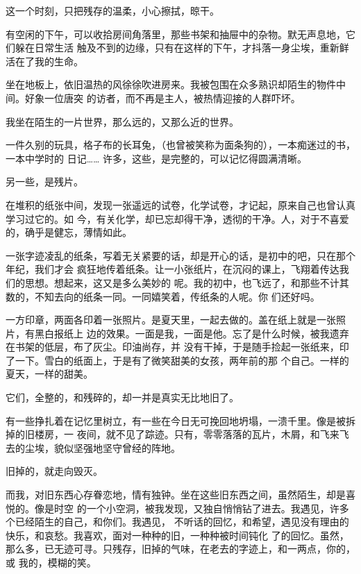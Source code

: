 		这一个时刻，只把残存的温柔，小心擦拭，晾干。

	\endwriting



		有空闲的下午，可以收拾房间角落里，那些书架和抽屉中的杂物。默无声息地，它们躲在日常生活
	触及不到的边缘，只有在这样的下午，才抖落一身尘埃，重新鲜活在了我的生命。

		坐在地板上，依旧温热的风徐徐吹进房来。我被包围在众多熟识却陌生的物件中间。好象一位唐突
	的访者，而不再是主人，被热情迎接的人群吓坏。

		我坐在陌生的一片世界，那么远的，又那么近的世界。

		一件久别的玩具，格子布的长耳兔，（也曾被笑称为面条狗的），一本痴迷过的书，一本中学时的
	日记…… 许多，这些，是完整的，可以记忆得圆满清晰。

		另一些，是残片。

		在堆积的纸张中间，发现一张遥远的试卷，化学试卷，才记起，原来自己也曾认真学习过它的。如
	今，有关化学，却已忘却得干净，透彻的干净。人，对于不喜爱的，确乎是健忘，薄情如此。

		一张字迹凌乱的纸条，写着无关紧要的话，却是开心的话，是初中的吧，只在那个年纪，我们才会
	疯狂地传着纸条。让一小张纸片，在沉闷的课上，飞翔着传达我们的思想。想起来，这又是多么美妙的
	呢。我的初中，也飞远了，和那些不计其数的，不知去向的纸条一同。一同嬉笑着，传纸条的人呢。你
	们还好吗。

		一方印章，两面各印着一张照片。是夏天里，一起去做的。盖在纸上就是一张照片，有黑白报纸上
	边的效果。一面是我，一面是他。忘了是什么时候，被我遗弃在书架的低层，布了灰尘。印油尚存，并
	没有干掉，于是随手捡起一张纸来，印了一下。雪白的纸面上，于是有了微笑甜美的女孩，两年前的那
	个自己。一样的夏天，一样的甜美。

		它们，全整的，和残碎的，却一并是真实无比地旧了。

		有一些挣扎着在记忆里树立，有一些在今日无可挽回地坍塌，一溃千里。像是被拆掉的旧楼房，一
	夜间，就不见了踪迹。只有，零零落落的瓦片，木屑，和飞来飞去的尘埃，貌似坚强地坚守曾经的阵地。

		旧掉的，就走向毁灭。

		而我，对旧东西心存眷恋地，情有独钟。坐在这些旧东西之间，虽然陌生，却是喜悦的。像是时空
	的一个小空洞，被我发现，又独自悄悄钻了进去。我遇见，许多个已经陌生的自己，和你们。我遇见，
	不听话的回忆，和希望，遇见没有理由的快乐，和哀愁。我喜欢，面对一种种的旧，一种种被时间钝化
	了的回忆。虽然，那么多，已无迹可寻。只残存，旧掉的气味，在老去的字迹上，和一两点，你的，或
	我的，模糊的笑。

